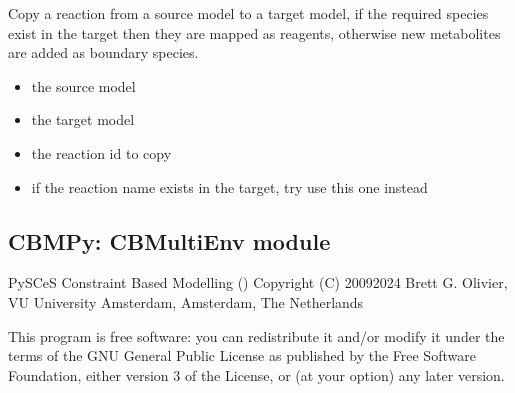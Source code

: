 \documentclass[letterpaper,12pt,english]{sphinxmanual}
\begin{document}

\begin{fulllineitems}
\label{\detokenize{api/visualization:cbmpy.CBMultiModel.copyReaction}}
\pysigstartsignatures
\pysiglinewithargsret
{}
{\sphinxparamcomma {}\sphinxparamcomma {}\sphinxparamcomma {}}
{}
\pysigstopsignatures
\sphinxAtStartPar
Copy a reaction from a source model to a target model, if the required species
exist in the target then they are mapped as reagents, otherwise new metabolites are
added as boundary species.
\begin{itemize}
\item {} 
\sphinxAtStartPar
{} the source model

\item {} 
\sphinxAtStartPar
{} the target model

\item {} 
\sphinxAtStartPar
{} the reaction id to copy

\item {} 
\sphinxAtStartPar
{} if the reaction name exists in the target, try use this one instead

\end{itemize}

\end{fulllineitems}


\subsection{CBMPy: CBMultiEnv module}
\label{\detokenize{api/visualization:cbmpy-cbmultienv-module}}\label{\detokenize{api/visualization:module-cbmpy.CBMultiEnv}}
\sphinxAtStartPar
PySCeS Constraint Based Modelling ()
Copyright (C) 2009\sphinxhyphen{}2024 Brett G. Olivier, VU University Amsterdam, Amsterdam, The Netherlands

\sphinxAtStartPar
This program is free software: you can redistribute it and/or modify
it under the terms of the GNU General Public License as published by
the Free Software Foundation, either version 3 of the License, or
(at your option) any later version.
\end{document}
